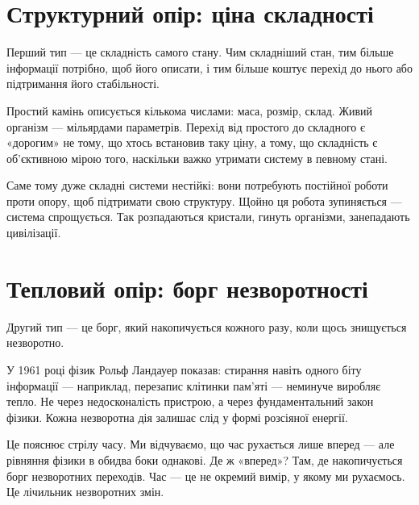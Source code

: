 \documentclass[12pt, a4paper, openany]{book}
\begin{document}
\section{Структурний опір: ціна складності}

Перший тип --- це складність самого стану. Чим складніший стан, тим більше інформації потрібно, щоб його описати, і тим більше коштує перехід до нього або підтримання його стабільності.

Простий камінь описується кількома числами: маса, розмір, склад. Живий організм --- мільярдами параметрів. Перехід від простого до складного є «дорогим» не тому, що хтось встановив таку ціну, а тому, що складність є об'єктивною мірою того, наскільки важко утримати систему в певному стані.

Саме тому дуже складні системи нестійкі: вони потребують постійної роботи проти опору, щоб підтримати свою структуру. Щойно ця робота зупиняється --- система спрощується. Так розпадаються кристали, гинуть організми, занепадають цивілізації.

\section{Тепловий опір: борг незворотності}

Другий тип --- це борг, який накопичується кожного разу, коли щось знищується незворотно.

У 1961 році фізик Рольф Ландауер показав: стирання навіть одного біту інформації --- наприклад, перезапис клітинки пам'яті --- неминуче виробляє тепло. Не через недосконалість пристрою, а через фундаментальний закон фізики. Кожна незворотна дія залишає слід у формі розсіяної енергії.

Це пояснює стрілу часу. Ми відчуваємо, що час рухається лише вперед --- але рівняння фізики в обидва боки однакові. Де ж «вперед»? Там, де накопичується борг незворотних переходів. Час --- це не окремий вимір, у якому ми рухаємось. Це лічильник незворотних змін.
\end{document}
